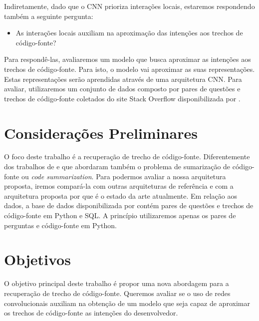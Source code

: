 Indiretamente, dado que o CNN prioriza interações locais, estaremos respondendo também a seguinte pergunta:
\begin{itemize}
        \item As interações locais auxiliam na aproximação das intenções aos trechos de código-fonte?
\end{itemize}

Para respondê-las, avaliaremos um modelo que busca aproximar as intenções aos trechos de código-fonte. Para isto, o modelo vai aproximar as suas representações. Estas representações serão aprendidas através de uma arquitetura CNN. Para avaliar, utilizaremos um conjunto de dados composto por pares de questões e trechos de código-fonte coletados do site Stack Overflow disponibilizada por \cite{yao-2018}. 


\section{Considerações Preliminares}
\label{sec:consideracoes_preliminares}

O foco deste trabalho é a recuperação de trecho de código-fonte. Diferentemente dos trabalhos de \cite{iyer-etal-2016-summarizing} e \cite{Allamanis-bimodal-source-code-natural-language:2015} que abordaram também o problema de sumarização de código-fonte ou \textit{code summarization}. Para podermos avaliar a nossa arquitetura proposta, iremos compará-la com outras arquiteturas de referência e com a arquitetura proposta por \cite{cambronero-deep-learning-code-search:2019} que é o estado da arte atualmente. Em relação aos dados, a base de dados disponibilizada por \cite{yao-2018} contém pares de questões e trechos de código-fonte em Python e SQL. A princípio utilizaremos apenas os pares de perguntas e código-fonte em Python.


\section{Objetivos}
\label{sec:objetivo}

O objetivo principal deste trabalho é propor uma nova abordagem para a recuperação de trecho de código-fonte. Queremos avaliar se o uso de redes convolucionais auxiliam na obtenção de um modelo que seja capaz de aproximar os trechos de código-fonte as intenções do desenvolvedor.

